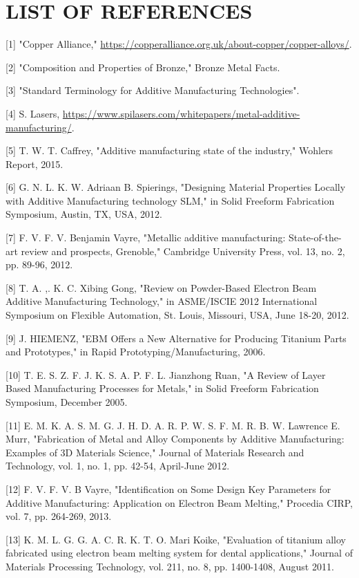 \documentclass[10pt]{article}
\begin{document}
\section*{LIST OF REFERENCES}
[1] "Copper Alliance," \href{https://copperalliance.org.uk/about-copper/copper-alloys/}{https://copperalliance.org.uk/about-copper/copper-alloys/}.

[2] "Composition and Properties of Bronze," Bronze Metal Facts.

[3] "Standard Terminology for Additive Manufacturing Technologies".

[4] S. Lasers, \href{https://www.spilasers.com/whitepapers/metal-additive-manufacturing/}{https://www.spilasers.com/whitepapers/metal-additive-manufacturing/}.

[5] T. W. T. Caffrey, "Additive manufacturing state of the industry," Wohlers Report, 2015.

[6] G. N. L. K. W. Adriaan B. Spierings, "Designing Material Properties Locally with Additive Manufacturing technology SLM," in Solid Freeform Fabrication Symposium, Austin, TX, USA, 2012.

[7] F. V. F. V. Benjamin Vayre, "Metallic additive manufacturing: State-of-the-art review and prospects, Grenoble," Cambridge University Press, vol. 13, no. 2, pp. 89-96, 2012.

[8] T. A. ,. K. C. Xibing Gong, "Review on Powder-Based Electron Beam Additive Manufacturing Technology," in ASME/ISCIE 2012 International Symposium on Flexible Automation, St. Louis, Missouri, USA, June 18-20, 2012.

[9] J. HIEMENZ, "EBM Offers a New Alternative for Producing Titanium Parts and Prototypes," in Rapid Prototyping/Manufacturing, 2006.

[10] T. E. S. Z. F. J. K. S. A. P. F. L. Jianzhong Ruan, "A Review of Layer Based Manufacturing Processes for Metals," in Solid Freeform Fabrication Symposium, December 2005.

[11] E. M. K. A. S. M. G. J. H. D. A. R. P. W. S. F. M. R. B. W. Lawrence E. Murr, "Fabrication of Metal and Alloy Components by Additive Manufacturing: Examples of 3D Materials Science," Journal of Materials Research and Technology, vol. 1, no. 1, pp. 42-54, April-June 2012.

[12] F. V. F. V. B Vayre, "Identification on Some Design Key Parameters for Additive Manufacturing: Application on Electron Beam Melting," Procedia CIRP, vol. 7, pp. 264-269, 2013.

[13] K. M. L. G. G. A. C. R. K. T. O. Mari Koike, "Evaluation of titanium alloy fabricated using electron beam melting system for dental applications," Journal of Materials Processing Technology, vol. 211, no. 8, pp. 1400-1408, August 2011.
\end{document}
